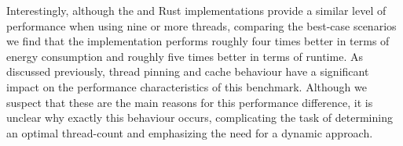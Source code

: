 Interestingly, although the \sac{} and Rust implementations provide a similar level of performance
when using nine or more threads, comparing the best-case scenarios we find that the \sac{}
implementation performs roughly four times better in terms of energy consumption and roughly five
times better in terms of runtime. As discussed previously, thread pinning and cache behaviour have a
significant impact on the performance characteristics of this benchmark. Although we suspect that
these are the main reasons for this performance difference, it is unclear why exactly this behaviour
occurs, complicating the task of determining an optimal thread-count and emphasizing the need for a
dynamic approach.
